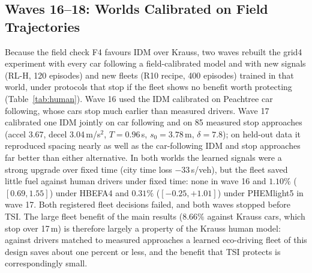 \subsection{Waves 16--18: Worlds Calibrated on Field Trajectories}\label{sec:w16}
Because the field check F4 favours IDM over Krauss, two waves rebuilt the grid4 experiment with every car following a field-calibrated
model and with new signals (RL-H, 120 episodes) and new fleets (R10 recipe, 400 episodes) trained in that world, under protocols that stop if
the fleet shows no benefit worth protecting (Table~\ref{tab:human}). Wave 16 used the IDM calibrated on Peachtree car following, whose cars
stop much earlier than measured drivers. Wave 17 calibrated one IDM jointly on car following and on 85 measured stop approaches (accel
3.67, decel 3.04\,m/s$^2$, $T=0.96$\,s, $s_0=3.78$\,m, $\delta=7.8$); on held-out data it reproduced spacing nearly as well as the car-following
IDM and stop approaches far better than either alternative. In both worlds the learned signals were a strong upgrade over fixed time (city
time loss $-33$\,s/veh), but the fleet saved little fuel against human drivers under fixed time: none in wave 16 and $1.10\%$ ($[0.69, 1.55]$)
under HBEFA4 and $0.31\%$ ($[-0.25, +1.01]$) under PHEMlight5 in wave 17. Both registered fleet decisions failed, and both waves stopped before
TSI. The large fleet benefit of the main results ($8.66\%$ against Krauss cars, which stop over 17\,m) is therefore largely a property of the
Krauss human model: against drivers matched to measured approaches a learned eco-driving fleet of this design saves about one percent or less,
and the benefit that TSI protects is correspondingly small.
